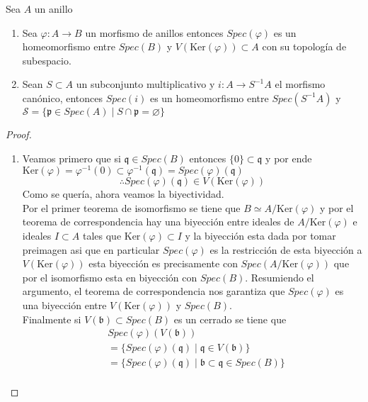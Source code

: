 \documentclass[14pt]{extarticle}
\begin{document}
\begin{proposicion}{}{}
    Sea $A$ un anillo
    \begin{enumerate}
        \item Sea $\varphi:A\rightarrow B$ un morfismo de anillos
        entonces $Spec(\varphi)$
        es un homeomorfismo entre $Spec(B)$ y $V(\mbox{Ker}(\varphi))\subset A$
        con su topología de subespacio.
        \item Sean $S\subset A$ un subconjunto multiplicativo y
        $i:A\rightarrow S^{-1}A$ el morfismo canónico, entonces
        $Spec(i)$ es un homeomorfismo entre $Spec(S^{-1}A)$ y 
        $\mathcal{S}=\{\mathfrak{p}\in Spec(A)\mid S\cap \mathfrak{p} = \varnothing\}$
    \end{enumerate}
\end{proposicion}
\begin{proof}
    \begin{enumerate}
        \item Veamos primero que si $\mathfrak{q}\in Spec(B)$
        entonces $\{0\}\subset \mathfrak{q}$ y por ende 
        $\mbox{Ker}(\varphi)=\varphi^{-1}(0)\subset\varphi^{-1}(\mathfrak{q}) 
        = Spec(\varphi)(\mathfrak{q})$
        $$\therefore Spec(\varphi)(\mathfrak{q}) \in V(\mbox{Ker}(\varphi))$$
        Como se quería, ahora veamos la biyectividad.\\
        Por el primer teorema de isomorfismo se tiene que $B \simeq A/\mbox{Ker}(\varphi)$
        y por el teorema de correspondencia hay una biyección entre ideales de $A/\mbox{Ker}(\varphi)$
        e ideales $I\subset A$ tales que $\mbox{Ker}(\varphi)\subset I$ y la biyección esta dada por
        tomar preimagen asi que en particular $Spec(\varphi)$ es la restricción de esta biyección
        a $V(\mbox{Ker}(\varphi))$ esta biyección es precisamente con $Spec(A/\mbox{Ker}(\varphi))$ que 
        por el isomorfismo esta en biyección con $Spec(B)$. Resumiendo el argumento,
        el teorema de correspondencia nos garantiza que $Spec(\varphi)$ es una biyección entre
        $V(\mbox{Ker}(\varphi))$ y $Spec(B)$.\\
        Finalmente si $V(\mathfrak{b})\subset Spec(B)$ es un cerrado se tiene que 
        \begin{align*}
            &Spec(\varphi)(V(\mathfrak{b}))\\
            &=\{Spec(\varphi)(\mathfrak{q})\mid \mathfrak{q}\in V(\mathfrak{b})\}\\
            &=\{ Spec(\varphi)(\mathfrak{q})\mid \mathfrak{b}\subset \mathfrak{q} \in Spec(B)\}\\

\end{align*}
\end{enumerate}
\end{proof}
\end{document}
